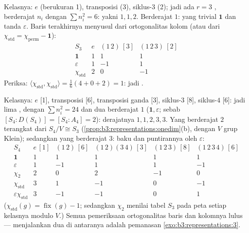\begin{example}[Tabel $S_3$]\label{ex:b3:representations:s3}
Kelasnya: $e$ (berukuran 1), transposisi (3), siklus-$3$ (2); jadi ada $r
= 3$ , berderajat $n_i$ dengan $\sum n_i^2 = 6$: yakni $1, 1,
2$. Berderajat $1$: yang trivial $\mathbf 1$ dan tanda $\varepsilon$.
Baris terakhirnya menyusul dari ortogonalitas kolom (atau dari
$\chi_{\mathrm{std}} = \chi_{\mathrm{perm}} - \mathbf 1$):
\[
\begin{array}{c|ccc}
S_3 & e & (1\,2)\ [3] & (1\,2\,3)\ [2]\\
\hline
\mathbf 1 & 1 & 1 & 1\\
\varepsilon & 1 & -1 & 1\\
\chi_{\mathrm{std}} & 2 & 0 & -1
\end{array}
\]
Periksa: $\langle\chi_{\mathrm{std}},\chi_{\mathrm{std}}\rangle =
\frac{1}{6}(4 + 0 + 2) = 1$: jadi .
\end{example}

\begin{example}[Tabel $S_4$]\label{ex:b3:representations:s4}
Kelasnya: $e$ [1], transposisi [6], transposisi ganda [3],
siklus-$3$ [8], siklus-$4$ [6]: jadi lima , dengan $\sum n_i^2 =
24$ dan dua  berderajat $1$ ($\mathbf 1, \varepsilon$; sebab $[S_4 :
D(S_4)] = [S_4 : A_4] = 2$): derajatnya $1, 1, 2, 3, 3$. Yang
berderajat $2$ terangkat dari $S_4/V \cong S_3$
(\cref{prop:b3:representations:onedim}(b), dengan $V$ grup Klein);
sedangkan yang berderajat $3$:  baku dan puntirannya oleh
$\varepsilon$:
\[
\begin{array}{c|ccccc}
S_4 & e\,[1] & (1\,2)\,[6] & (1\,2)(3\,4)\,[3] &
(1\,2\,3)\,[8] & (1\,2\,3\,4)\,[6]\\
\hline
\mathbf 1 & 1 & 1 & 1 & 1 & 1\\
\varepsilon & 1 & -1 & 1 & 1 & -1\\
\chi_2 & 2 & 0 & 2 & -1 & 0\\
\chi_{\mathrm{std}} & 3 & 1 & -1 & 0 & -1\\
\varepsilon\chi_{\mathrm{std}} & 3 & -1 & -1 & 0 & 1
\end{array}
\]
($\chi_{\mathrm{std}}(g) = \operatorname{fix}(g) - 1$; sedangkan
$\chi_2$ menilai tabel $S_3$ pada peta setiap kelasnya
modulo $V$.) Semua pemeriksaan ortogonalitas baris dan kolomnya lulus ---
menjalankan dua di antaranya adalah pemanasan \cref{exo:b3:representations:3}.
\end{example}

